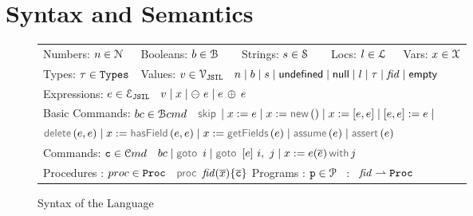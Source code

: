 


\newtheorem{lemmax}{}
\newtheorem{temax}{}
\newtheorem{cormax}{}

\section{\jsil Syntax and Semantics}

\vspace*{-0.2cm}
\begin{figure}[!ht]
\begin{minipage}{\textwidth}
\begin{tabular}{lllll}
	 Numbers: $n \in \mathcal{N}$ &  Booleans: $b \in \mathcal{B}$ & \  \ Strings: $s \in {\mathcal S}$ & \  \ Locs: $l \in {\mathcal L}$ & \  Vars: $x \in \mathcal{X}$ \\[0.1cm]
	Types: $\tau \in \mathtt{Types}$ & \multicolumn{4}{l}{Values: $v \in \mathcal{V}_{\mathtt{JSIL}}$  \ $n \mid b \mid s \mid  {\sf undefined} \mid {\sf null} \mid l \mid \tau \mid \mathit{fid} \mid {\sf empty}$} \\[0.1cm]
\multicolumn{5}{l}{Expressions: $e \in \mathcal{E}_{\mathtt{JSIL}}$  \ $v \mid x \mid \ominus\ e \mid e \, \oplus_{} \, e $} \\[0.1cm]
	\multicolumn{5}{l}{Basic Commands: $bc \in \mathcal{B}cmd$ \ $\jsilskip \mid \jvar := \jsilexpr  \mid \jvar := \jsilnew() \mid \jvar := [\jsilexpr, \jsilexpr] \mid [\jsilexpr, \jsilexpr] := \jsilexpr \mid$} \\[0.1cm]
	\multicolumn{5}{l}{\hspace{2.8cm} $\jsildelete(\jsilexpr, \jsilexpr) \mid \jvar := \hasfield(\jsilexpr, \jsilexpr) \mid \jvar := \getfields(\jsilexpr) \mid \assume(\jsilexpr) \mid \assert(\jsilexpr)$} \\[0.1cm]
	\multicolumn{5}{l}{Commands: $\mathtt{c} \in \mathcal{C}md$  \ $ \bcmd \mid \goto \ i \mid  \ifgoto{\jsilexpr}{i}{j} \mid \jsilcall{\jvar}{\jsilexpr}{\jvec{\jsilexpr}}{j}$} \\[0.1cm]
	\multicolumn{5}{l}{Procedures : $proc \in \mathtt{Proc}$  \ $\procedure{\fid}{\jvec{\jvar}}{\jvec{\ivlcmd}}$ \qquad Programs : $\mathtt{p} \in \mathcal{P}$ \ : \ $\mathit{fid} \rightharpoonup \mathtt{Proc}$}
 \end{tabular}
 \vspace*{-0.2cm}
 \caption{Syntax of the \jsil Language}
 \label{def:app:jsil-types}
 \end{minipage}
  \vspace*{-0.5cm}
 \end{figure}



